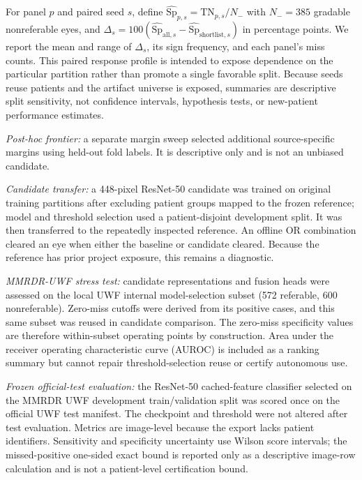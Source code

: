 \documentclass{ieeeaccess}
\begin{document}
For panel $p$ and paired seed $s$, define $\widehat{\mathrm{Sp}}_{p,s}=\mathrm{TN}_{p,s}/N_-$ with $N_-=385$ gradable nonreferable eyes, and $\Delta_s=100(\widehat{\mathrm{Sp}}_{\mathrm{all},s}-\widehat{\mathrm{Sp}}_{\mathrm{shortlist},s})$ in percentage points. We report the mean and range of $\Delta_s$, its sign frequency, and each panel's miss counts. This paired response profile is intended to expose dependence on the particular partition rather than promote a single favorable split. Because seeds reuse patients and the artifact universe is exposed, summaries are descriptive split sensitivity, not confidence intervals, hypothesis tests, or new-patient performance estimates.

\textit{Post-hoc frontier:} a separate margin sweep selected additional source-specific margins using held-out fold labels. It is descriptive only and is not an unbiased candidate.

\textit{Candidate transfer:} a 448-pixel ResNet-50 candidate was trained on original training partitions after excluding patient groups mapped to the frozen reference; model and threshold selection used a patient-disjoint development split. It was then transferred to the repeatedly inspected reference. An offline OR combination cleared an eye when either the baseline or candidate cleared. Because the reference has prior project exposure, this remains a diagnostic.

\textit{MMRDR-UWF stress test:} candidate representations and fusion heads were assessed on the local UWF internal model-selection subset (572 referable, 600 nonreferable). Zero-miss cutoffs were derived from its positive cases, and this same subset was reused in candidate comparison. The zero-miss specificity values are therefore within-subset operating points by construction. Area under the receiver operating characteristic curve (AUROC) is included as a ranking summary but cannot repair threshold-selection reuse or certify autonomous use.

\textit{Frozen official-test evaluation:} the ResNet-50 cached-feature classifier selected on the MMRDR UWF development train/validation split was scored once on the official UWF test manifest. The checkpoint and threshold were not altered after test evaluation. Metrics are image-level because the export lacks patient identifiers. Sensitivity and specificity uncertainty use Wilson score intervals; the missed-positive one-sided exact bound is reported only as a descriptive image-row calculation and is not a patient-level certification bound.
\end{document}
